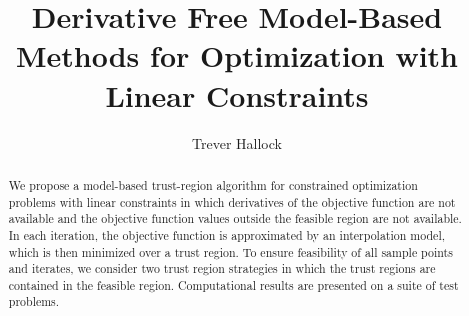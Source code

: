 \documentclass{article}
\title{Derivative Free Model-Based Methods for Optimization with Linear Constraints}
\author{Trever Hallock}
\begin{document}
\maketitle

\begin{abstract}

We propose a model-based trust-region algorithm for constrained optimization problems with linear constraints in which derivatives of the objective function are not available and the objective function values outside the feasible region are not available.
In each iteration, the objective function is approximated by an interpolation model, which is then minimized over a trust region.
To ensure feasibility of all sample points and iterates, we consider two trust region strategies in which the trust regions are contained in the feasible region.
Computational results are presented on a suite of test problems.

\end{abstract}

\newpage

\tableofcontents

\newpage





\newpage



\appendix





\end{document}
